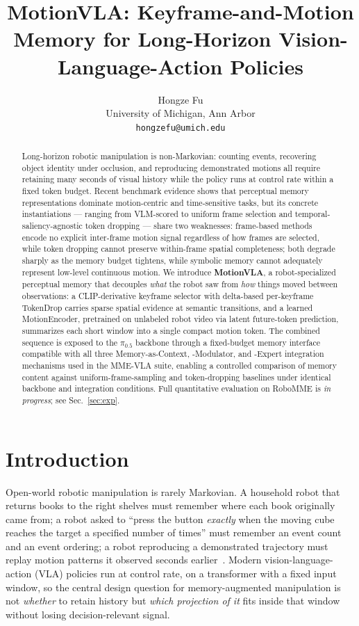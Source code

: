 \documentclass{article}
\title{MotionVLA: Keyframe-and-Motion Memory for Long-Horizon Vision-Language-Action Policies}
\author{%
  Hongze Fu \\
  University of Michigan, Ann Arbor \\
  \texttt{hongzefu@umich.edu} \\
}
\begin{document}
\maketitle


\begin{abstract}
Long-horizon robotic manipulation is non-Markovian: counting events,
recovering object identity under occlusion, and reproducing demonstrated
motions all require retaining many seconds of visual history while the
policy runs at control rate within a fixed token budget. Recent benchmark
evidence shows that perceptual memory representations
dominate motion-centric and time-sensitive tasks, but its concrete
instantiations --- ranging from VLM-scored to uniform frame selection and
temporal-saliency-agnostic token dropping --- share two weaknesses: frame-based
methods encode no explicit inter-frame motion signal regardless of how frames
are selected, while token dropping cannot preserve within-frame spatial
completeness; both degrade sharply as the memory budget tightens, while symbolic memory cannot adequately
represent low-level continuous motion. We introduce \textbf{MotionVLA}, a robot-specialized
perceptual memory that decouples \emph{what} the robot saw from \emph{how}
things moved between observations: a CLIP-derivative keyframe selector with
delta-based per-keyframe TokenDrop carries sparse spatial evidence at
semantic transitions, and a learned MotionEncoder, pretrained on unlabeled
robot video via latent future-token prediction,
summarizes each short window into a single compact motion
token. The combined sequence is exposed to the $\pi_{0.5}$ backbone
through a fixed-budget memory interface compatible with all three
Memory-as-Context, -Modulator, and -Expert integration mechanisms used in
the MME-VLA suite, enabling a controlled comparison of memory content
against uniform-frame-sampling and token-dropping baselines under
identical backbone and integration conditions. Full quantitative evaluation on RoboMME is
\emph{in progress}; see Sec.~\ref{sec:exp}.
\end{abstract}


\section{Introduction}
\label{sec:intro}

Open-world robotic manipulation is rarely Markovian. A household robot that
returns books to the right shelves must remember where each book originally
came from; a robot asked to ``press the button \emph{exactly} when the
moving cube reaches the target a specified number of times'' must
remember an event count and an event ordering; a robot reproducing a
demonstrated trajectory must replay motion patterns it observed seconds
earlier~\citep{dai2026robomme}. Modern vision-language-action (VLA) policies
run at control rate, on a transformer with a fixed input window, so the
central design question for memory-augmented manipulation is not
\emph{whether} to retain history but \emph{which projection of it} fits
inside that window without losing decision-relevant signal.
\end{document}

